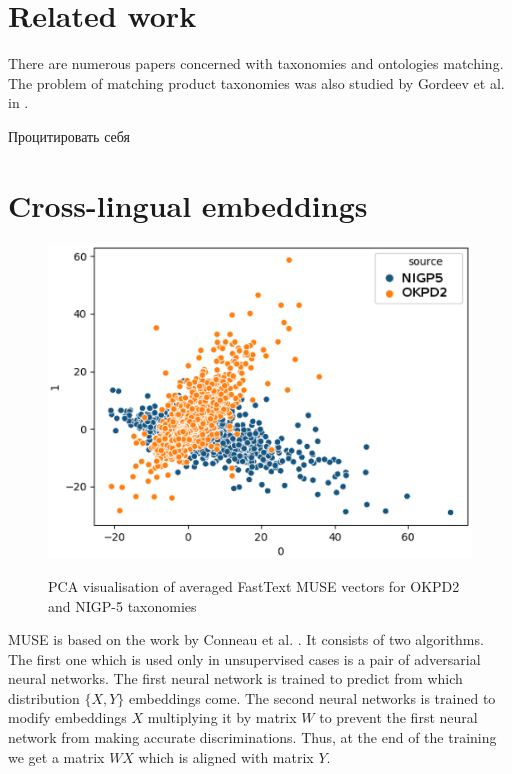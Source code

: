\documentclass[11pt,a4paper]{article}
\begin{document}
\section{Related work}
There are numerous papers concerned with taxonomies and ontologies matching. The problem of matching product taxonomies was also studied by Gordeev et al. in \citeyearpar{gordeev-fruct}.

\foreignlanguage{russian}{Процитировать себя}
\section{Cross-lingual embeddings}

\begin{figure}
	
	\centering
	\small
	\includegraphics[scale=0.5]{tsne_new}\\

	\caption{PCA visualisation of averaged FastText MUSE vectors for OKPD2 and NIGP-5 taxonomies}
	\label{original-doc2vec}
\end{figure}

MUSE is based on the work by Conneau et al. \cite{muse}. It consists of two algorithms. The first one which is used only in unsupervised cases is a pair of adversarial neural networks. The first neural network is trained to predict from which distribution $\{X, Y\}$ embeddings come. The second neural networks is trained to modify embeddings $X$ multiplying it by matrix $W$ to prevent the first neural network from making accurate discriminations. Thus, at the end of the training we get a matrix $WX$ which is aligned with matrix $Y$.
\end{document}
